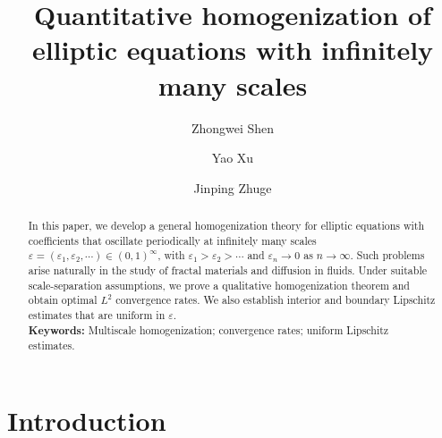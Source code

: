 \documentclass[reqno,12pt]{amsart} %
\theoremstyle{definition}
\theoremstyle{remark}
\numberwithin{equation}{section}
\newcommand{\e}{\varepsilon}
\begin{document}
\title[Infinitely Many Scales]{Quantitative homogenization of elliptic equations with infinitely many scales}

\author{Zhongwei Shen}

\address{Zhongwei Shen: Institute for Theoretical Sciences, Westlake University, No. 600 Dunyu Road, Xihu District, Hangzhou,
Zhejiang 310030, P.R. China.}

\author{Yao Xu}
\address{Yao Xu: School of Mathematical Sciences, University of Chinese Academy of Sciences, Beijing, 100049, China.}

\author{Jinping Zhuge}
\address{Jinping Zhuge: Morningside Center of Mathematics, Academy of Mathematics and systems science,
Chinese Academy of Sciences, Beijing 100190, China.}

\date{}

\begin{abstract}
    In this paper, we develop a general homogenization theory for elliptic equations with coefficients that  oscillate periodically at infinitely many scales $\varepsilon = (\varepsilon_1, \varepsilon_2, \cdots) \in (0,1)^\infty$, with $\e_1>\e_2>\cdots$ and $\varepsilon_n \to 0$ as $n \to \infty$. Such problems arise naturally in the study of fractal materials and diffusion in fluids. Under suitable scale-separation assumptions, we prove a qualitative homogenization theorem and obtain optimal $L^2$ convergence rates. We also establish interior and boundary Lipschitz estimates that are uniform in $\e$. \\

    \noindent \textbf{Keywords:} Multiscale homogenization; convergence rates; uniform Lipschitz estimates.
\end{abstract}

\maketitle


\section{Introduction}
\end{document}
